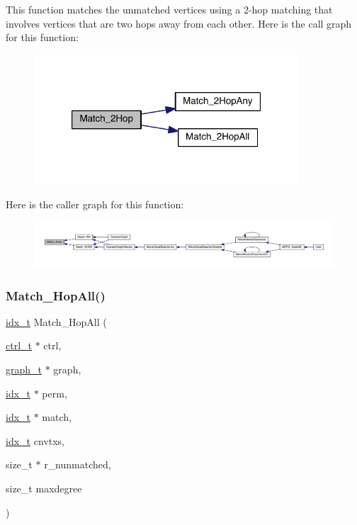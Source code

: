This function matches the unmatched vertices using a 2-\/hop matching that involves vertices that are two hops away from each other. Here is the call graph for this function\+:\nopagebreak
\begin{figure}[H]
\begin{center}
\leavevmode
\includegraphics[width=280pt]{a00182_aead846b2c69509c914426ff087509934_cgraph}
\end{center}
\end{figure}
Here is the caller graph for this function\+:\nopagebreak
\begin{figure}[H]
\begin{center}
\leavevmode
\includegraphics[width=350pt]{a00182_aead846b2c69509c914426ff087509934_icgraph}
\end{center}
\end{figure}
\mbox{\label{a00182_aa56d53cace160be27fb1750dcaffbc04}} 
\subsubsection{\texorpdfstring{Match\+\_\+Hop\+All()}{Match\_2HopAll()}}
{\footnotesize\ttfamily \hyperlink{a00876_aaa5262be3e700770163401acb0150f52}{idx\+\_\+t} Match\+\_\+Hop\+All (\begin{DoxyParamCaption}\item[{\hyperlink{a00742}{ctrl\+\_\+t} $\ast$}]{ctrl,  }\item[{\hyperlink{a00734}{graph\+\_\+t} $\ast$}]{graph,  }\item[{\hyperlink{a00876_aaa5262be3e700770163401acb0150f52}{idx\+\_\+t} $\ast$}]{perm,  }\item[{\hyperlink{a00876_aaa5262be3e700770163401acb0150f52}{idx\+\_\+t} $\ast$}]{match,  }\item[{\hyperlink{a00876_aaa5262be3e700770163401acb0150f52}{idx\+\_\+t}}]{cnvtxs,  }\item[{size\+\_\+t $\ast$}]{r\+\_\+nunmatched,  }\item[{size\+\_\+t}]{maxdegree }\end{DoxyParamCaption})}

